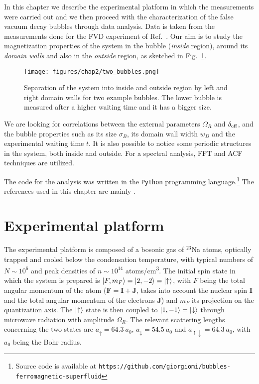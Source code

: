 In this chapter we describe the experimental platform in which the measurements were carried out and we then proceed with the characterization of the false vacuum decay bubbles through data analysis. Data is taken from the measurements done for the FVD experiment of Ref.\ \cite{zenesini2024false}. Our aim is to study the magnetization properties of the system in the bubble (\textit{inside} region), around its \textit{domain walls} and also in the \textit{outside} region, as sketched in Fig.\ \ref{fig:2bubbles}. 
\begin{figure}[ht!]
    \centering
    \texttt{[image: figures/chap2/two\_bubbles.png]}
    \caption{Separation of the system into inside and outside region by left and right domain walls for two example bubbles. The lower bubble is measured after a higher waiting time and it has a bigger size.}
    \label{fig:2bubbles}
\end{figure}
We are looking for correlations between the external parameters $\Omega_R$ and $\delta_{\rm eff}$, and the bubble properties such as its size $\sigma_B$, its domain wall width $w_D$ and the experimental waiting time $t$. It is also possible to notice some periodic structures in the system, both inside and outside. 
For a spectral analysis, FFT and ACF techniques are utilized. 

The code for the analysis was written in the \texttt{Python} programming language.\footnote{Source code is available at \texttt{https://github.com/giorgiomi/bubbles-ferromagnetic-superfluid}} The references used in this chapter are mainly \cite{cominotti2023ferro,farolfi2021,cominotti2023experiments,cominotti2024ultracold}.

\section{Experimental platform}
The experimental platform is composed of a bosonic gas of $^{23}$Na atoms, optically trapped and cooled below the condensation temperature, with typical numbers of $N \sim 10^6$ and peak densities of $n \sim 10^{14}$ atoms/\unit{\centi\meter\cubed}. The initial spin state in which the system is prepared is $\ket{F, m_F} = \ket{2, -2} = \ket{\uparrow}$, with $F$ being the total angular momentum of the atom 
($\mathbf{F} = \mathbf{I} + \mathbf{J}$, takes into account the nuclear spin $\mathbf{I}$ and the total angular momentum of the electrons $\mathbf{J}$) 
and $m_F$ its projection on the quantization axis. The $\ket{\uparrow}$ state is then coupled to $\ket{1, -1} = \ket{\downarrow}$ through microwave radiation with amplitude $\Omega_R$. The relevant scattering lengths concerning the two states are $a_\uparrow = 64.3\ a_0$, $a_\downarrow = 54.5\ a_0$ and $a_{\uparrow\downarrow} = 64.3\ a_0$, with $a_0$ being the Bohr radius.

